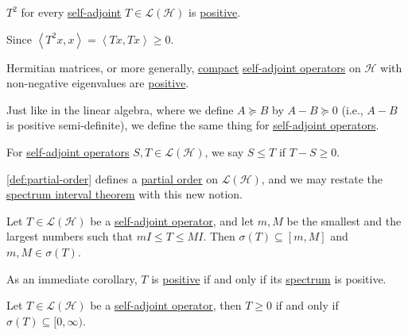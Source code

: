 \begin{eg}
	\(T^2\) for every \hyperref[def:self-adjoint-op]{self-adjoint} \(T\in \mathcal{L} (\mathcal{H} )\) is \hyperref[def:positive-op]{positive}.
\end{eg}
\begin{explanation}
	Since \(\left\langle T^2 x, x \right\rangle = \left\langle Tx, Tx \right\rangle \geq 0\).
\end{explanation}

\begin{eg}
	Hermitian matrices, or more generally, \hyperref[def:compact-op]{compact} \hyperref[def:self-adjoint-op]{self-adjoint operators} on \(\mathcal{H} \) with non-negative eigenvalues are \hyperref[def:positive-op]{positive}.
\end{eg}

Just like in the linear algebra, where we define \(A \succeq B\) by \(A - B \succeq 0\) (i.e., \(A-B\) is positive semi-definite), we define the same thing for \hyperref[def:self-adjoint-op]{self-adjoint operators}.

\begin{definition}\label{def:partial-order}
	For \hyperref[def:self-adjoint-op]{self-adjoint operators} \(S, T\in \mathcal{L} (\mathcal{H} )\), we say \(S \leq T\) if \(T - S \geq 0\).
\end{definition}

\autoref{def:partial-order} defines a \href{https://en.wikipedia.org/wiki/Partially_ordered_set}{partial order} on \(\mathcal{L} (\mathcal{H} )\), and we may restate the \hyperref[thm:spectrum-interval]{spectrum interval theorem} with this new notion.

\begin{theorem}\label{thm:spectrum-interval-2}
	Let \(T\in \mathcal{L} (\mathcal{H} )\) be a \hyperref[def:self-adjoint-op]{self-adjoint operator}, and let \(m, M\) be the smallest and the largest numbers such that \(mI \leq T \leq MI\). Then \(\sigma (T) \subseteq [m, M]\) and \(m, M\in \sigma (T)\).
\end{theorem}

As an immediate corollary, \(T\) is \hyperref[def:positive-op]{positive} if and only if its \hyperref[def:spectrum-point]{spectrum} is positive.

\begin{corollary}
	Let \(T\in \mathcal{L} (\mathcal{H} )\) be a \hyperref[def:self-adjoint-op]{self-adjoint operator}, then \(T \geq 0\) if and only if \(\sigma (T) \subseteq [0, \infty )\).
\end{corollary}

